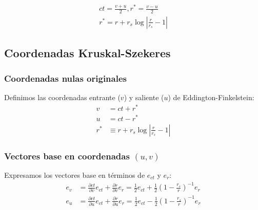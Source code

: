 \begin{equation}
    \begin{array}{l}
        c t=\frac{v+u}{2}, r^*=\frac{v-u}{2} \\
        r^*=r+r_s \log \left|\frac{r}{r_s}-1\right|
    \end{array}
\end{equation}
\subsection{Coordenadas Kruskal-Szekeres}

\subsubsection{Coordenadas nulas originales}
Definimos las coordenadas entrante (\(v\)) y saliente (\(u\)) de Eddington-Finkelstein:
\begin{equation}
    \begin{aligned}
        v   & = ct + r^*                                      \\
        u   & = ct - r^*                                      \\
        r^* & \equiv r + r_s \log\left|\frac{r}{r_s}-1\right|
    \end{aligned}
\end{equation}

\subsubsection{Vectores base en coordenadas \( (u, v) \)}
Expresamos los vectores base en términos de \( e_{ct} \) y \( e_r \):
\begin{equation}
    \begin{aligned}
        e_v & = \frac{\partial ct}{\partial v}e_{ct} + \frac{\partial r}{\partial v}e_r = \frac{1}{2}e_{ct} + \frac{1}{2}\left(1-\frac{r_s}{r}\right)^{-1}e_r \\
        e_u & = \frac{\partial ct}{\partial u}e_{ct} + \frac{\partial r}{\partial u}e_r = \frac{1}{2}e_{ct} - \frac{1}{2}\left(1-\frac{r_s}{r}\right)^{-1}e_r
    \end{aligned}
\end{equation}

